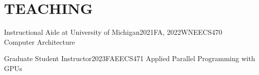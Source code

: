 \section{TEACHING}
    \resumeSubHeadingListStart
        \resumeSubheading
        {Instructional Aide at University of Michigan}{2021FA, 2022WN}{EECS470 Computer Architecture}{}
        \resumeItemListStart
        \resumeItemListEnd
        
        \resumeSubheading
        {Graduate Student Instructor}{2023FA}{EECS471 Applied Parallel Programming with GPUs}{}
        \resumeItemListStart
        \resumeItemListEnd
            
    \resumeSubHeadingListEnd
